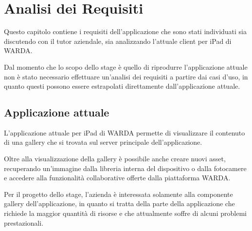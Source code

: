 
\chapter{Analisi dei Requisiti}
\label{cap:analisi-dei-requisiti}

Questo capitolo contiene i requisiti dell'applicazione che sono stati individuati sia discutendo con il tutor aziendale, sia analizzando l'attuale client per iPad di WARDA.

Dal momento che lo scopo dello stage è quello di riprodurre l'applicazione attuale non è stato necessario effettuare un'analisi dei requisiti a partire dai casi d'uso, in quanto questi possono essere estrapolati direttamente dall'applicazione attuale.





\section{Applicazione attuale}

L'applicazione attuale per iPad di WARDA permette di visualizzare il contenuto di una gallery che si trovata sul server principale dell'applicazione.

Oltre alla visualizzazione della gallery è possibile anche creare nuovi asset, recuperando un'immagine dalla libreria interna del dispositivo o dalla fotocamere e accedere alla funzionalità collaborative offerte dalla piattaforma WARDA.

Per il progetto dello stage, l'azienda è interessata solamente alla componente gallery dell'applicazione, in quanto si tratta della parte della applicazione che richiede la maggior quantità di risorse e che attualmente soffre di alcuni problemi prestazionali.

